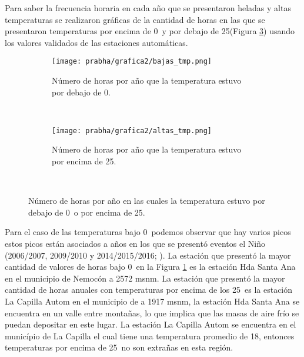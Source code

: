 
Para saber la frecuencia horaria en cada año que se presentaron heladas y altas temperaturas se realizaron gráficas de la cantidad de horas en las que se presentaron temperaturas por encima de 0\celc\ y por debajo de 25\celc (Figura \ref{subfig:temp_horarias_ext}) usando los valores validados de las estaciones automáticas.\\

\begin{figure}[H]
    \centering

	\begin{subfigure}[b]{0.45\textwidth}
        \caption{Número de horas por año que la temperatura estuvo por debajo de 0\celc.}
	\texttt{[image: prabha/grafica2/bajas\_tmp.png]}
    \label{subfig:tmp_0}
	\end{subfigure}
	~
		\begin{subfigure}[b]{0.45\textwidth}
        \caption{Número de horas por año que la temperatura estuvo por encima de 25\celc.}
	\texttt{[image: prabha/grafica2/altas\_tmp.png]}
    \label{subfig:tmp_25}
	\end{subfigure}
	~

\caption{Número de horas por año en las cuales la temperatura estuvo por debajo de 0\celc\ o por encima de 25\celc.}	
\label{subfig:temp_horarias_ext}	
\end{figure}

Para el caso de las temperaturas bajo 0\celc\ podemos observar que hay varios picos estos picos están asociados a años en los que se presentó eventos el Niño (2006/2007, 2009/2010 y 2014/2015/2016; \citep{NOAA-ORI}). La estación que presentó la mayor cantidad de valores de horas bajo 0\celc\ en la Figura \ref{subfig:tmp_0} es la estación Hda Santa Ana en el municipio de Nemocón a 2572 msnm. La estación que presentó la mayor cantidad de horas anuales con temperaturas por encima de los 25\celc\ es la estación La Capilla Autom en el municipio de a 1917 msnm, la estación Hda Santa Ana se encuentra en un valle entre montañas, lo que implica que las masas de aire frío se puedan depositar en este lugar. La estación La Capilla Autom se encuentra en el município de La Capilla el cual tiene una temperatura promedio de 18\celc, entonces temperaturas por encima de 25\celc\ no son extrañas en esta región.\\

